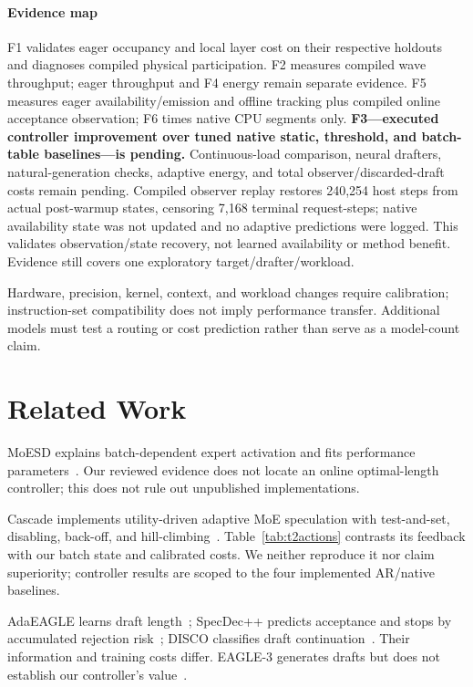 \documentclass[conference,letterpaper]{IEEEtran}
\begin{document}
\paragraph{Evidence map} F1 validates eager occupancy and local layer cost on their respective holdouts and diagnoses compiled physical participation. F2 measures compiled wave throughput; eager throughput and F4 energy remain separate evidence. F5 measures eager availability/emission and offline tracking plus compiled online acceptance observation; F6 times native CPU segments only. \textbf{F3---executed controller improvement over tuned native static, threshold, and batch-table baselines---is pending.} Continuous-load comparison, neural drafters, natural-generation checks, adaptive energy, and total observer/discarded-draft costs remain pending. Compiled observer replay restores 240,254 host steps from actual post-warmup states, censoring 7,168 terminal request-steps; native availability state was not updated and no adaptive predictions were logged. This validates observation/state recovery, not learned availability or method benefit. Evidence still covers one exploratory target/drafter/workload.

Hardware, precision, kernel, context, and workload changes require calibration; instruction-set compatibility does not imply performance transfer. Additional models must test a routing or cost prediction rather than serve as a model-count claim.

\section{Related Work}
MoESD explains batch-dependent expert activation and fits performance parameters~\cite{moesd}. Our reviewed evidence does not locate an online optimal-length controller; this does not rule out unpublished implementations.

Cascade implements utility-driven adaptive MoE speculation with test-and-set, disabling, back-off, and hill-climbing~\cite{cascade}. Table~\ref{tab:t2actions} contrasts its feedback with our batch state and calibrated costs. We neither reproduce it nor claim superiority; controller results are scoped to the four implemented AR/native baselines.

AdaEAGLE learns draft length~\cite{adaeagle}; SpecDec++ predicts acceptance and stops by accumulated rejection risk~\cite{specdecpp}; DISCO classifies draft continuation~\cite{disco}. Their information and training costs differ. EAGLE-3 generates drafts but does not establish our controller's value~\cite{eagle3}.
\end{document}

